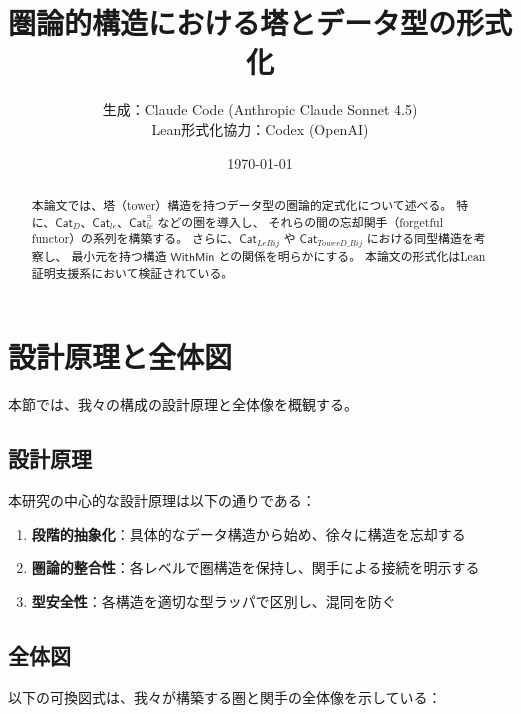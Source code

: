 \documentclass[a4paper,12pt]{ltjsarticle}
\title{圏論的構造における塔とデータ型の形式化}
\author{%
  生成：Claude Code (Anthropic Claude Sonnet 4.5)\\
  Lean形式化協力：Codex (OpenAI)%
}
\date{\today}
\theoremstyle{definition}
\begin{document}
\maketitle

\begin{abstract}
本論文では、塔（tower）構造を持つデータ型の圏論的定式化について述べる。
特に、$\mathsf{Cat}_D$、$\mathsf{Cat}_{le}$、$\mathsf{Cat}_{le}^{\exists}$ などの圏を導入し、
それらの間の忘却関手（forgetful functor）の系列を構築する。
さらに、$\mathsf{Cat}_{LeBij}$ や $\mathsf{Cat}_{TowerD\_Bij}$ における同型構造を考察し、
最小元を持つ構造 $\mathsf{WithMin}$ との関係を明らかにする。
本論文の形式化はLean証明支援系において検証されている。
\end{abstract}

\tableofcontents
\newpage

\section{設計原理と全体図}

本節では、我々の構成の設計原理と全体像を概観する。

\subsection{設計原理}

本研究の中心的な設計原理は以下の通りである：

\begin{enumerate}[label=(\roman*)]
  \item \textbf{段階的抽象化}：具体的なデータ構造から始め、徐々に構造を忘却する
  \item \textbf{圏論的整合性}：各レベルで圏構造を保持し、関手による接続を明示する
  \item \textbf{型安全性}：各構造を適切な型ラッパで区別し、混同を防ぐ
\end{enumerate}

\subsection{全体図}

以下の可換図式は、我々が構築する圏と関手の全体像を示している：

\begin{center}
\end{center}
\end{document}
